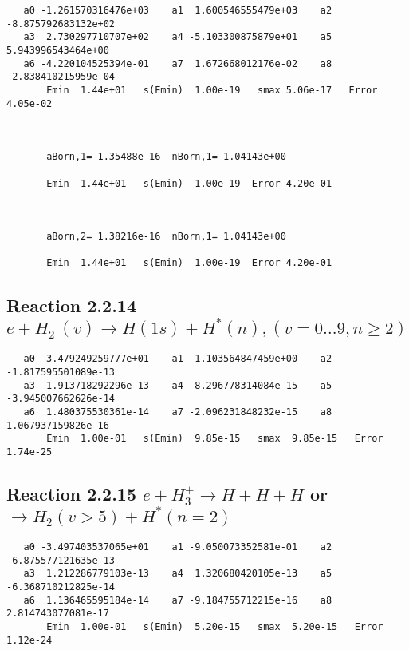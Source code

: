 \documentclass[12pt]{article}
\begin{document}
\begin{small}\begin{verbatim}
   a0 -1.261570316476e+03    a1  1.600546555479e+03    a2 -8.875792683132e+02
   a3  2.730297710707e+02    a4 -5.103300875879e+01    a5  5.943996543464e+00
   a6 -4.220104525394e-01    a7  1.672668012176e-02    a8 -2.838410215959e-04
       Emin  1.44e+01   s(Emin)  1.00e-19   smax 5.06e-17   Error 4.05e-02



       aBorn,1= 1.35488e-16  nBorn,1= 1.04143e+00

       Emin  1.44e+01   s(Emin)  1.00e-19  Error 4.20e-01



       aBorn,2= 1.38216e-16  nBorn,1= 1.04143e+00

       Emin  1.44e+01   s(Emin)  1.00e-19  Error 4.20e-01
\end{verbatim}\end{small}




\newpage
\subsection{
Reaction 2.2.14 $   e + H_2^+(v) \rightarrow H(1s) + H^*(n), (v=0\ldots 9, n\geq 2)$}



\begin{small}\begin{verbatim}
   a0 -3.479249259777e+01    a1 -1.103564847459e+00    a2 -1.817595501089e-13
   a3  1.913718292296e-13    a4 -8.296778314084e-15    a5 -3.945007662626e-14
   a6  1.480375530361e-14    a7 -2.096231848232e-15    a8  1.067937159826e-16
       Emin  1.00e-01   s(Emin)  9.85e-15   smax  9.85e-15   Error  1.74e-25
\end{verbatim}\end{small}




\newpage
\subsection{
Reaction 2.2.15 $   e + H_3^+ \rightarrow  H + H + H$ or $\rightarrow H_2(v > 5) + H^*(n=2)$}





\begin{small}\begin{verbatim}
   a0 -3.497403537065e+01    a1 -9.050073352581e-01    a2 -6.875577121635e-13
   a3  1.212286779103e-13    a4  1.320680420105e-13    a5 -6.368710212825e-14
   a6  1.136465595184e-14    a7 -9.184755712215e-16    a8  2.814743077081e-17
       Emin  1.00e-01   s(Emin)  5.20e-15   smax  5.20e-15   Error  1.12e-24
\end{verbatim}\end{small}
\end{document}
